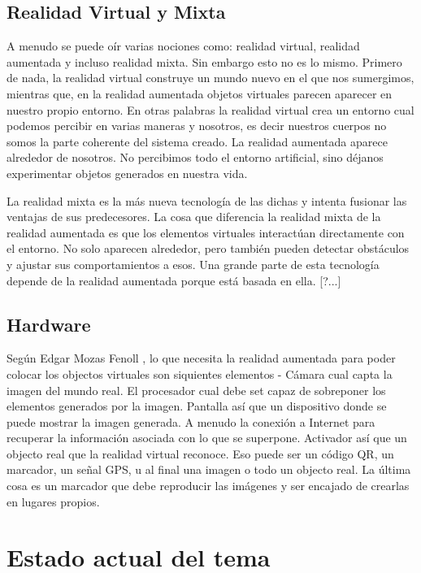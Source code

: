 \documentclass[a4paper,11pt]{scrartcl}
\begin{document}
\subsection{Realidad Virtual y Mixta}
A menudo se puede oír varias nociones como: realidad virtual, realidad aumentada y incluso realidad mixta. Sin embargo esto no es lo mismo. Primero de nada, la realidad virtual construye un mundo nuevo en el que nos sumergimos, mientras que, en la realidad aumentada objetos virtuales parecen aparecer en nuestro propio entorno. En otras palabras la realidad virtual crea un entorno cual podemos percibir en varias maneras y nosotros, es decir nuestros cuerpos no somos la parte coherente del sistema creado. La realidad aumentada aparece alrededor de nosotros. No percibimos todo el entorno artificial, sino déjanos experimentar objetos generados en nuestra vida.
\par La realidad mixta es la más nueva tecnología de las dichas y intenta fusionar las ventajas de sus predecesores. La cosa que diferencia la realidad mixta de la realidad aumentada es que los elementos virtuales interactúan directamente con el entorno. No solo aparecen alrededor, pero también pueden detectar obstáculos y ajustar sus comportamientos a esos. Una grande parte de esta tecnología depende de la realidad aumentada porque está basada en ella. [?...] 

\subsection{Hardware}
Según Edgar Mozas Fenoll \cite{hardware}, lo que necesita la realidad aumentada para poder colocar los objectos virtuales son siquientes elementos -
Cámara cual capta la imagen del mundo real. El procesador cual debe set capaz de sobreponer los elementos generados por la imagen. Pantalla así que un dispositivo donde se puede mostrar la imagen generada. A menudo la conexión a Internet para recuperar la información asociada con lo que se superpone. Activador así que un objecto real que la realidad virtual reconoce. Eso puede ser un código QR, un marcador, un señal GPS, u al final una imagen o todo un objecto real. La última cosa es un marcador que debe reproducir las imágenes y ser encajado de crearlas en lugares propios.
%

\section{Estado actual del tema}
\end{document}
